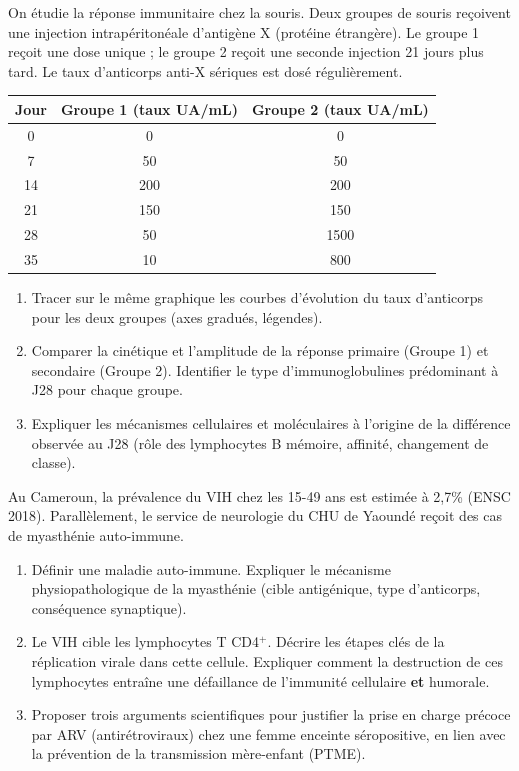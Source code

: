 \documentclass[11pt]{article}
\begin{document}
\begin{exercice}
On étudie la réponse immunitaire chez la souris. Deux groupes de souris reçoivent une injection intrapéritonéale d'antigène X (protéine étrangère). Le groupe 1 reçoit une dose unique ; le groupe 2 reçoit une seconde injection 21 jours plus tard. Le taux d'anticorps anti-X sériques est dosé régulièrement.
\begin{center}
\begin{tabular}{|c|c|c|}
\hline
\bfseries Jour & \bfseries Groupe 1 (taux UA/mL) & \bfseries Groupe 2 (taux UA/mL) \\
\hline
0 & 0 & 0 \\
7 & 50 & 50 \\
14 & 200 & 200 \\
21 & 150 & 150 \\
28 & 50 & 1500 \\
35 & 10 & 800 \\
\hline
\end{tabular}
\end{center}
\begin{enumerate}
    \item Tracer sur le même graphique les courbes d'évolution du taux d'anticorps pour les deux groupes (axes gradués, légendes).
    \item Comparer la cinétique et l'amplitude de la réponse primaire (Groupe 1) et secondaire (Groupe 2). Identifier le type d'immunoglobulines prédominant à J28 pour chaque groupe.
    \item Expliquer les mécanismes cellulaires et moléculaires à l'origine de la différence observée au J28 (rôle des lymphocytes B mémoire, affinité, changement de classe).
\end{enumerate}
\end{exercice}

\begin{exercice}
Au Cameroun, la prévalence du VIH chez les 15-49 ans est estimée à 2,7\% (ENSC 2018). Parallèlement, le service de neurologie du CHU de Yaoundé reçoit des cas de myasthénie auto-immune.
\begin{enumerate}
    \item Définir une maladie auto-immune. Expliquer le mécanisme physiopathologique de la myasthénie (cible antigénique, type d'anticorps, conséquence synaptique).
    \item Le VIH cible les lymphocytes T CD4$^+$. Décrire les étapes clés de la réplication virale dans cette cellule. Expliquer comment la destruction de ces lymphocytes entraîne une défaillance de l'immunité cellulaire \textbf{et} humorale.
    \item Proposer trois arguments scientifiques pour justifier la prise en charge précoce par ARV (antirétroviraux) chez une femme enceinte séropositive, en lien avec la prévention de la transmission mère-enfant (PTME).
\end{enumerate}
\end{exercice}
\end{document}
